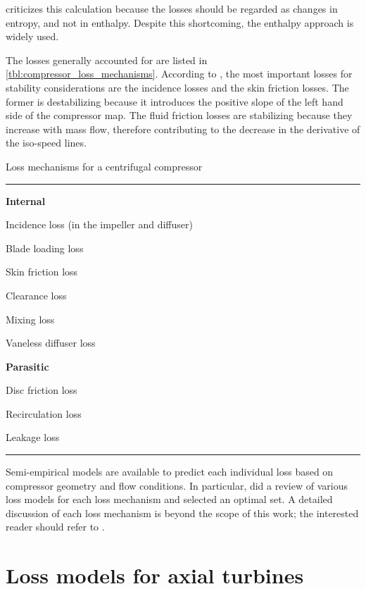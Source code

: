 \textcite{Aungier1995} criticizes this calculation because the losses should be regarded as changes in entropy, and not in enthalpy. Despite this shortcoming, the enthalpy approach is widely used.

The losses generally accounted for are listed in \cref{tbl:compressor_loss_mechanisms}. According to \textcite{Gravdahl2004,Gravdahl1999,Watson1982}, the most important losses for stability considerations are the incidence losses and the skin friction losses. The former is destabilizing because it introduces the positive slope of the left hand side of the compressor map. The fluid friction losses are stabilizing because they increase with mass flow, therefore contributing to the decrease in the derivative of the iso-speed lines.
\begin{table}
\caption{Loss mechanisms for a centrifugal compressor}
\label{tbl:compressor_loss_mechanisms}
\hrule
\begin{multicols}{2}
\begin{compactitem}
    \item[] \textbf{Internal}
    \item Incidence loss (in the impeller and diffuser)
    \item Blade loading loss
    \item Skin friction loss
    \item Clearance loss
    \item Mixing loss
    \item Vaneless diffuser loss
    \columnbreak
    \item[] \textbf{Parasitic}
    \item Disc friction loss
    \item Recirculation loss
    \item Leakage loss
\end{compactitem}
\end{multicols}
\hrule
{}
\end{table}

Semi-empirical models are available to predict each individual loss based on compressor geometry and flow conditions. 
In particular, \textcite{Oh1997} did a review of various loss models for each loss mechanism and selected an optimal set.
A detailed discussion of each loss mechanism is beyond the scope of this work; 
the interested reader should refer to \textcite{Cumpsty2004}. 

\section{Loss models for axial turbines}

